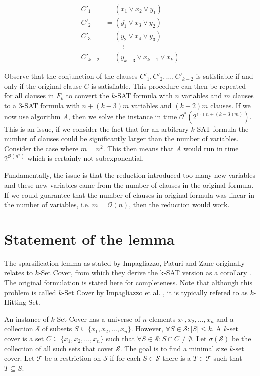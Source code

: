 \begin{align*}
C'_{1} &= (x_{1} \lor x_{2} \lor y_{1}) \\
C'_{2} &= (\overline{y_{1}} \lor x_{3} \lor y_{2}) \\
C'_{3} &= (\overline{y_{2}} \lor x_{4} \lor y_{3}) \\
&\hspace{30pt}\vdots \\
C'_{k-2} &= (\overline{y_{k-3}} \lor x_{k-1} \lor x_{k})
\end{align*}

Observe that the conjunction of the clauses $C'_{1}, C'_{2}, \dots, C'_{k-2}$
is satisfiable if and only if the original clause $C$ is satisfiable.
This procedure can then be repeated for all clauses in $F_{k}$ to convert
the $k$-SAT formula with $n$ variables and $m$ clauses to a 3-SAT formula with $n + (k-3)m$ variables
and $(k-2)m$ clauses.
If we now use algorithm $A$, then we solve the instance in time $\mathcal{O}^{\ast}(2^{\epsilon \cdot (n + (k - 3)m)})$.
This is an issue, if we consider the fact that for an arbitrary $k$-SAT formula the number of
clauses could be significantly larger than the number of variables. Consider the case where $m = n^2$.
This then means that $A$ would run in time $2^{\mathcal{O}(n^2)}$ which is certainly not subexponential.

Fundamentally, the issue is that the reduction introduced too many new variables and these new variables
came from the number of clauses in the original formula. If we could guarantee that the number of
clauses in original formula was linear in the number of variables, i.e. $m = \mathcal{O}(n)$,
then the reduction would work.

\section{Statement of the lemma}
The sparsification lemma as stated by Impagliazzo, Paturi and Zane originally relates to
$k$-Set Cover, from which they derive the k-SAT version as a corollary \cite{impagliazzo2001problems}.
The original formulation is stated here for completeness. Note that although this problem is called
$k$-Set Cover by Impagliazzo et al. \cite{impagliazzo2001problems}, it is typically refered to as $k$-Hitting Set.

An instance of $k$-Set Cover has a universe of $n$ elements $x_1, x_2, \dots, x_n$ and a collection $\mathcal{S}$
of subsets $S \subseteq \{x_1, x_2, \dots, x_n\}$. However, $\forall S \in \mathcal{S} : |S| \leq k$.
A $k$-set cover is a set $C \subseteq \{x_1, x_2, \dots, x_n\}$ such that $\forall S \in \mathcal{S} : S \cap C \neq \emptyset$.
Let $\sigma(\mathcal{S})$ be the collection of all such sets that cover $\mathcal{S}$. The goal is to find a minimal size $k$-set cover.
Let $\mathcal{T}$ be a restriction on $\mathcal{S}$ if for each $S \in \mathcal{S}$ there is a $T \in \mathcal{T}$ such that $T \subseteq S$.

